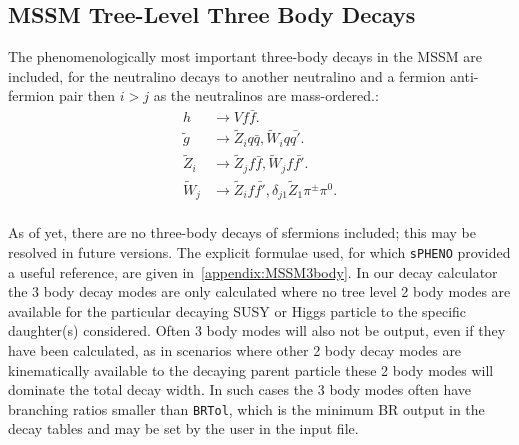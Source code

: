 \documentclass[final,3p,times]{elsarticle}
\begin{document}
\subsection{MSSM Tree-Level Three Body Decays}
The phenomenologically most important three-body decays in the MSSM are included, for the neutralino decays to another neutralino and a fermion anti-fermion pair then $i>j$ as the neutralinos are mass-ordered.:
\begin{align*}
h &\rightarrow V f \bar{f}. \\
\tilde{g} &\rightarrow \tilde{Z}_i q \bar{q}, \tilde{W}_i q \bar{q'}. \\
\tilde{Z}_{i} &\rightarrow \tilde{Z}_j f \bar{f}, \tilde{W}_j f \bar{f'}. \\
\tilde{W}_{j} &\rightarrow \tilde{Z}_i f \bar{f'}, \delta_{j1} \tilde{Z}_1
                \pi^\pm \pi^0. \\
\end{align*}

As of yet, there are no three-body decays of sfermions included; this may be
resolved in future versions. The explicit formulae used, for which {\tt sPHENO}
\cite{Porod:2003um} provided a useful reference, are given in~\ref{appendix:MSSM3body}. In our decay calculator the 3 body decay modes
are only calculated where no tree level 2 body modes are available for the particular
decaying SUSY or Higgs particle to the specific daughter(s) considered. Often
3 body modes will also not be output, even if they have been calculated,
as in scenarios where other 2 body decay modes are kinematically available
to the decaying parent particle these 2 body modes will dominate the total
decay width. In such cases the 3 body modes often have branching ratios
smaller than {\tt BRTol}, which is the minimum BR output in the decay tables and may be
set by the user in the input file. 
\end{document}
